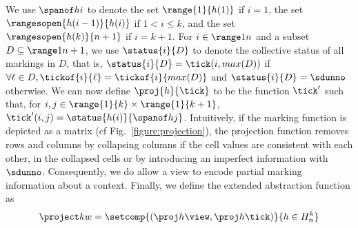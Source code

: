 We use $\spanof h i$ to denote the set $\range{1}{h(1)}$ if $i=1$, the
set $\rangesopen{h(i-1)}{h(i)}$ if $1<i\leq k$, and the set
$\rangesopen{h(k)}{n+1}$ if $i=k+1$.
%
For $i\in\range 1 n$ and a subset $D\subseteq\range 1 {n+1}$, we use
$\status{i}{D}$ to denote the collective status of all markings in $D$,
that is, $\status{i}{D} = \tick(i,max(D))$ if $\forall\ell\in{D},
\tickof{i}{\ell}=\tickof{i}{max(D)}$ and $\status{i}{D} = \sdunno$ otherwise.
%
We can now define $\proj{h}{\tick}$ to be the function $\tick'$ such
that, for $i,j\in\range{1}{k}\times\range{1}{k+1}$, %
$\tick'(i,j) = \status{h(i)}{\spanof h j}$.
%
Intuitively, if the marking function is depicted as a matrix (cf
Fig.~\ref{figure:projection}), the projection function removes rows
and columns by collapsing columns if the cell values are consistent
with each other, in the collapsed cells or by introducing an imperfect
information with $\sdunno$.
%
Consequently, we do allow a view to encode partial marking information
about a context.
%
Finally, we define the extended abstraction function as %
$$
\project k {w} = \setcomp{%
  (\proj h {\view}, \proj h \tick)%
}{%
  h\in H_{n}^{k} %
}%
$$
%

